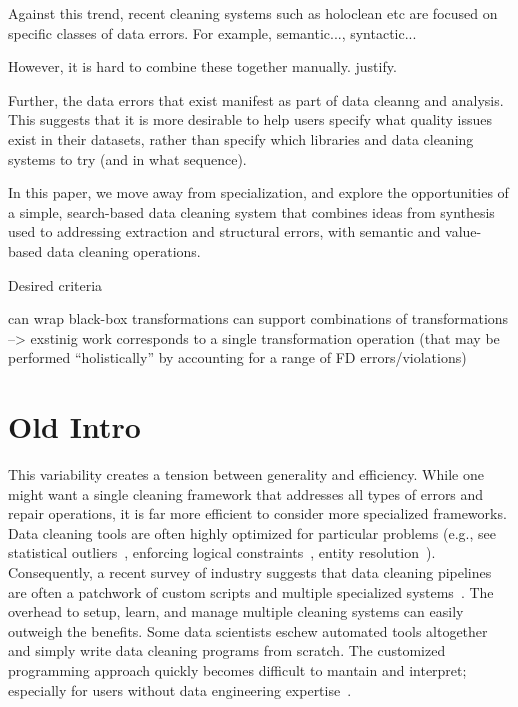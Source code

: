 Against this trend, recent cleaning systems such as holoclean etc are focused on specific classes of data errors.  For example, semantic..., syntactic...

However, it is hard to combine these together manually.  justify.

Further, the data errors that exist manifest as part of data cleanng and analysis.  This suggests that it is more desirable to help users specify what quality issues exist in their datasets, rather than specify which libraries and data cleaning systems to try (and in what sequence).

In this paper, we move away from specialization, and explore the opportunities of a simple, search-based data cleaning system that combines ideas from synthesis used to addressing extraction and structural errors, with semantic and value-based data cleaning operations.


Desired criteria

can wrap black-box transformations
can support combinations of transformations --> exstinig work corresponds to a single transformation operation (that may be performed ``holistically'' by accounting for a range of FD errors/violations)



\section{Old Intro}



This variability creates a tension between generality and efficiency.
While one might want a single cleaning framework that addresses all types of errors and repair operations, it is far more efficient to consider more specialized frameworks.
Data cleaning tools are often highly optimized for particular problems  (e.g., see statistical outliers~\cite{hellerstein2008quantitative}, enforcing logical constraints~\cite{DBLP:conf/sigmod/ChuIKW16}, entity resolution~\cite{DBLP:journals/pvldb/KopckeTR10}). 
Consequently, a recent survey of industry suggests that data cleaning pipelines are often a patchwork of custom scripts and multiple specialized systems~\cite{krishnan2016hilda}.
The overhead to setup, learn, and manage multiple cleaning systems can easily outweigh the benefits.
Some data scientists eschew automated tools altogether and simply write data cleaning programs from scratch.
The customized programming approach quickly becomes difficult to mantain and interpret; especially for users without data engineering expertise~\cite{sculley2014machine}.

